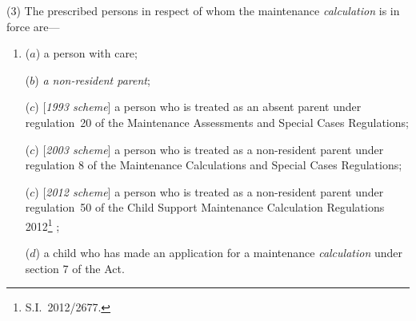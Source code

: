 \documentclass[12pt,a4paper]{article}
\begin{document}
(3) The prescribed persons in respect of whom the maintenance 
\emph{calculation} 
is in force are—
\begin{enumerate}\item[]
($a$) a person with care;

($b$) 
\emph{a non-resident parent};

($c$) [\emph{1993 scheme}] a person who is treated as an absent parent under regulation~20 of the Maintenance Assessments and Special Cases Regulations;

($c$) [\emph{2003 scheme}] a person who is treated as 
a non-resident parent 
under 
regulation 8 of the Maintenance Calculations and Special Cases Regulations;  %

($c$) [\emph{2012 scheme}] a person who is treated as 
a non-resident parent 
under 
regulation~50 of the Child Support Maintenance Calculation Regulations 2012\footnote{S.I.~2012/2677.}%
;

($d$) a child who has made an application for a maintenance 
\emph{calculation} 
under section 7 of the Act.
\end{enumerate}
\end{document}

